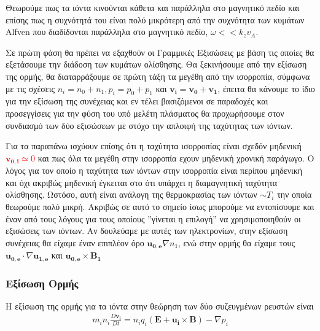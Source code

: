 \documentclass[a4paper]{article}
\begin{document}
                Θεωρούμε πως τα ιόντα κινούνται κάθετα και παράλληλα στο μαγνητικό πεδίο
                και επίσης πως η συχνότητά του είναι πολύ μικρότερη από την συχνότητα των κυμάτων Alfven που διαδίδονται παράλληλα στο μαγνητικό πεδίο, $\omega << k_zv_A$. %
	  				
	  		Σε πρώτη φάση θα πρέπει να εξαχθούν οι Γραμμικές Εξισώσεις με βάση τις οποίες θα εξετάσουμε την διάδοση των κυμάτων ολίσθησης. Θα ξεκινήσουμε από την εξίσωση της ορμής, θα διαταρράξουμε σε πρώτη τάξη τα μεγέθη από την ισορροπία, σύμφωνα με τις σχέσεις $n_i = n_0+n_1, p_i=p_0+p_1$ και $\bm{v_i}=\bm{v_0}+\bm{v_1}$, έπειτα θα κάνουμε το ίδιο για την εξίσωση της συνέχειας και εν τέλει βασιζόμενοι σε παραδοχές και προσεγγίσεις για την φύση του υπό μελέτη πλάσματος θα προχωρήσουμε στον συνδιασμό των δύο εξισώσεων με στόχο την απλοιφή της ταχύτητας των ιόντων.

                    Για τα παραπάνω ισχύουν επίσης ότι η ταχύτητα ισορροπίας είναι σχεδόν μηδενική \textcolor{red}{$\bm{v_{0,i}}\simeq0$} και πως όλα τα μεγέθη στην ισορροπία εχουν μηδενική χρονική παράγωγο. Ο λόγος για τον οποίο η ταχύτητα των ιόντων στην ισορροπία είναι περίπου μηδενική και όχι ακριβώς μηδενική έγκειται στο ότι υπάρχει η διαμαγνητική ταχύτητα ολίσθησης. Ωστόσο, αυτή είναι ανάλογη της θερμοκρασίας των ιόντων $\sim T_i$ την οποία θεωρούμε πολύ μικρή. Ακριβώς σε αυτό το σημείο ίσως μπορούμε να εντοπίσουμε και έναν από τους λόγους για τους οποίους ''γίνεται η επιλογή'' να χρησιμοποιηθούν οι εξισώσεις των ιόντων. Αν δουλεύαμε με αυτές των ηλεκτρονίων, στην εξίσωση συνέχειας θα είχαμε έναν επιπλέον όρο $\bm{u_{0,e}}\nabla n_1$, ενώ στην ορμής θα είχαμε τους $\bm{u_{0,e}}\cdot\nabla \bm{u_{1,e}}$ και $\bm{u_{0,e}}\times\bm{B_1}$


                \subsubsection*{Εξίσωση Ορμής}
                    Η εξίσωση της ορμής για τα ιόντα στην θεώρηση των δύο συζευγμένων ρευστών είναι 
                        \begin{align*}
                            m_in_i\frac{D\bm{v_i}}{Dt} = n_i q_i (\bm{E}+\bm{u_i}\times\bm{B})-\nabla p_i 
                        \end{align*}
                        
\end{document}
